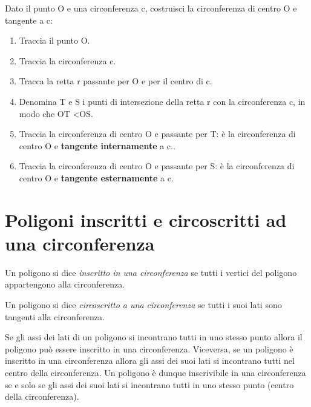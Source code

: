 \begin{procedura}
  Dato il punto O e una circonferenza c, costruisci la circonferenza di 
centro O e tangente a c:
  \begin{enumerate} [nosep]
    \item 
    Traccia il punto O.
    \item 
    Traccia la circonferenza c.
    \item 
    Tracca la retta  r  passante per O e per il centro di c.
    \item 
    Denomina T e S i punti di intersezione della retta  r con la 
circonferenza c, in modo che OT <OS.
    \item 
    Traccia la circonferenza di centro O e passante per T: è la 
circonferenza di centro O e \textbf{tangente internamente} a c..
    \item 
    Traccia la circonferenza di centro O e passante per S: è la 
circonferenza di centro O e \textbf{tangente esternamente} a c.
  \end{enumerate}
\end{procedura}


\section{Poligoni inscritti e circoscritti ad una 
circonferenza}\label{sect:poligoni_circonferenza}

\begin{definizione}
Un poligono si dice \emph{inscritto in una circonferenza} se tutti i 
vertici del poligono appartengono alla circonferenza.
\end{definizione}

\begin{definizione}
Un poligono si dice \emph{circoscritto a una circonferenza} se tutti 
i suoi lati sono tangenti alla circonferenza.
\end{definizione}


\begin{inaccessibleblock}
 \begin{figure}[htb]
  \centering
\end{figure}
\end{inaccessibleblock}

\begin{teorema}
Se gli assi dei lati di un poligono si incontrano tutti in uno 
stesso punto allora il poligono può essere inscritto in una 
circonferenza. Viceversa, se un poligono è inscritto in una 
circonferenza allora gli assi dei suoi lati si incontrano tutti nel 
centro della circonferenza.
Un poligono è dunque inscrivibile in una circonferenza se e solo se gli assi 
dei suoi lati si incontrano tutti in uno stesso punto (centro della 
circonferenza).
\end{teorema}


